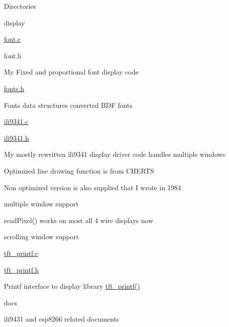 \begin{DoxyParagraph}{Directories}
\begin{DoxyItemize}
\begin{DoxyItemize}
\begin{DoxyItemize}
\begin{DoxyItemize}
\end{DoxyItemize}
\end{DoxyItemize}
\end{DoxyItemize}
\item display
\begin{DoxyItemize}
\item \hyperlink{font_8c}{font.\+c}
\item font.\+h
\begin{DoxyItemize}
\item My Fixed and proportional font display code
\end{DoxyItemize}
\item \hyperlink{fonts_8h}{fonts.\+h}
\begin{DoxyItemize}
\item Fonts data structures converted B\+DF fonts
\end{DoxyItemize}
\item \hyperlink{ili9341_8c}{ili9341.\+c}
\item \hyperlink{ili9341_8h}{ili9341.\+h}
\begin{DoxyItemize}
\item My mostly rewritten ili9341 display driver code handles multiple windows
\begin{DoxyItemize}
\item Optimized line drawing function is from C\+H\+E\+R\+TS
\item Non optimized version is also supplied that I wrote in 1984
\item multiple window support
\item read\+Pixel() works on most all 4 wire displays now
\item scrolling window support
\end{DoxyItemize}
\end{DoxyItemize}
\item \hyperlink{tft__printf_8c}{tft\+\_\+printf.\+c}
\item \hyperlink{tft__printf_8h}{tft\+\_\+printf.\+h}
\begin{DoxyItemize}
\item Printf interface to display library \hyperlink{tft__printf_8c_ad6d6dda4facdc045d477c0cc9403e0c1}{tft\+\_\+printf()}
\end{DoxyItemize}
\end{DoxyItemize}
\item docs
\begin{DoxyItemize}
\item ili9431 and esp8266 related documents
\end{DoxyItemize}

\end{DoxyItemize}
\end{DoxyParagraph}
